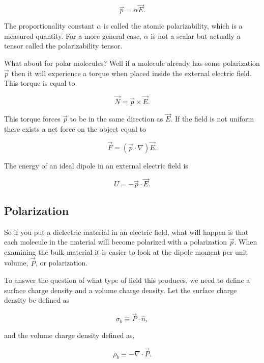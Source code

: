 \documentclass[preprint, review,12pt]{elsarticle}
\def\x{\times}
\def\.{\cdot}
\begin{document}
\begin{equation}
    \vec{p} = \alpha \vec{E}.
\end{equation}

The proportionality constant $\alpha$ is called the atomic polarizability, which is a measured quantity. For a more general case, $\alpha$ is not a scalar but actually a tensor called the polarizability tensor.  


What about for polar molecules? Well if a molecule already has some polarization $\vec{p}$ then it will experience a torque when placed inside the external electric field. This torque is equal to 

\begin{equation}
    \vec{N} = \vec{p} \x \vec{E}.
\end{equation}

This torque forces $\vec{p}$ to be in the same direction as $\vec{E}$. If the field is not uniform there exists a net force on the object equal to 

\begin{equation}
    \vec{F} = (\vec{p} \. \nabla)\vec{E}.
\end{equation}

The energy of an ideal dipole in an external electric field is

\begin{equation}
    U = - \vec{p} \. \vec{E}.
\end{equation}

\subsection{Polarization}

So if you put a dielectric material in an electric field, what will happen is that each molecule in the material will become polarized with a polarization $\vec{p}$. When examining the bulk material it is easier to look at the dipole moment per unit volume, $\vec{P}$, or polarization.

To answer the question of what type of field this produces, we need to define a surface charge density and a volume charge density. Let the surface charge density be defined as 

\begin{equation}
    \sigma_b \equiv \vec{P} \. \hat{n},
\end{equation}

and the volume charge density defined as,

\begin{equation}
    \rho_b \equiv - \nabla \. \vec{P}.
\end{equation}
\end{document}
